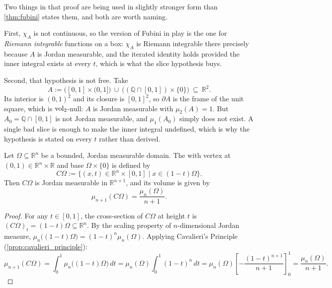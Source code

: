 \begin{ainote}
\label{note:cavalieri_hypotheses}
Two things in that proof are being used in slightly stronger form than
\cref{thm:fubini} states them, and both are worth naming.

First, $\chi_A$ is not continuous, so the version of Fubini in play is the one for
\emph{Riemann integrable} functions on a box: $\chi_A$ is Riemann integrable there precisely
because $A$ is Jordan measurable, and the iterated identity holds provided the inner integral
exists at every $t$, which is what the slice hypothesis buys.

Second, that hypothesis is not free. Take
\[A := \big([0,1]\times(0,1]\big) \ \cup\ \big((\mathbb{Q}\cap[0,1])\times\{0\}\big)
  \ \subseteq\ \mathbb{R}^2 .\]
Its interior is $(0,1)^2$ and its closure is $[0,1]^2$, so $\partial A$ is the frame of the unit
square, which is $\operatorname{vol}_2$-null: $A$ is Jordan measurable with $\mu_2(A) = 1$. But
$A_0 = \mathbb{Q}\cap[0,1]$ is not Jordan measurable, and $\mu_1(A_0)$ simply does not exist. A
single bad slice is enough to make the inner integral undefined, which is why the hypothesis is
stated on every $t$ rather than derived.
\end{ainote}

\begin{theorem}
\label{thm:cone_volume_formula}
Let $\Omega \subseteq \mathbb{R}^n$ be a bounded, Jordan measurable domain. The   with vertex at $(0,1) \in \mathbb{R}^n \times \mathbb{R}$ and base $\Omega \times \{0\}$ is defined by
\[
C\Omega := \big\{(x, t) \in \mathbb{R}^n \times [0,1] \mid x \in (1-t)\Omega\big\}.
\]
Then $C\Omega$ is Jordan measurable in $\mathbb{R}^{n+1}$, and its volume is given by
\[
\mu_{n+1}(C\Omega) = \frac{\mu_n(\Omega)}{n+1}.
\]
\end{theorem}

\begin{proof}
For any $t \in [0,1]$, the cross-section of $C\Omega$ at height $t$ is $(C\Omega)_t = (1-t)\Omega \subseteq \mathbb{R}^n$. By the scaling property of $n$-dimensional Jordan measure, $\mu_n\big((1-t)\Omega\big) = (1-t)^n \mu_n(\Omega)$. Applying Cavalieri's Principle (\cref{prop:cavalieri_principle}):
\[
\mu_{n+1}(C\Omega) = \int_0^1 \mu_n\big((1-t)\Omega\big) \,dt = \mu_n(\Omega) \int_0^1 (1-t)^n \,dt = \mu_n(\Omega) \left[ -\frac{(1-t)^{n+1}}{n+1} \right]_0^1 = \frac{\mu_n(\Omega)}{n+1}.
\]
\end{proof}

